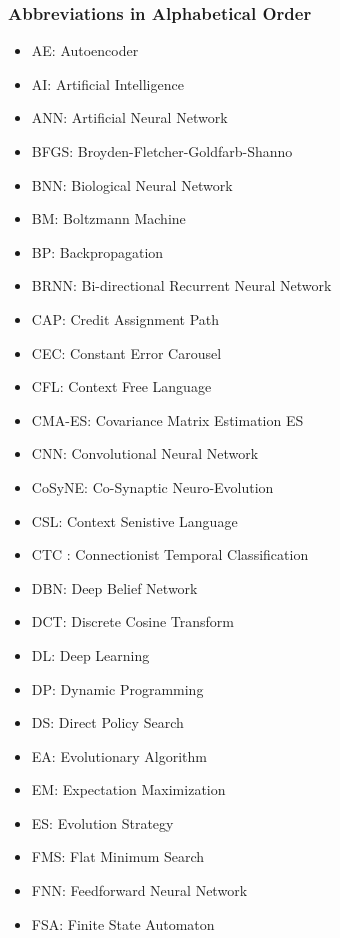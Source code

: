 \documentclass[letterpaper]{article}
\begin{document}
\subsubsection*{Abbreviations in Alphabetical Order}
\label{abb}
\vspace{-0.5cm}
\begin{multicols}{2}
\begin{itemize}[leftmargin=0cm,itemindent=0cm,labelwidth=\itemindent,labelsep=0cm,align=left,noitemsep,nolistsep]
\item[] AE: Autoencoder    
\item[] AI: Artificial Intelligence 
\item[] ANN: Artificial Neural Network    
\item[] BFGS: Broyden-Fletcher-Goldfarb-Shanno    
\item[] BNN: Biological Neural Network 
\item[] BM: Boltzmann Machine 
\item[] BP: Backpropagation 
\item[] BRNN: Bi-directional Recurrent Neural Network 
\item[] CAP: Credit Assignment Path 
\item[] CEC: Constant Error Carousel 
\item[] CFL: Context Free Language 
\item[] CMA-ES: Covariance Matrix Estimation ES 
\item[] CNN: Convolutional Neural Network 
\item[] CoSyNE: Co-Synaptic Neuro-Evolution 
\item[] CSL: Context Senistive Language
\item[] CTC : Connectionist Temporal Classification 
\item[] DBN: Deep Belief Network 
\item[] DCT: Discrete Cosine Transform
\item[] DL: Deep Learning 
\item[] DP: Dynamic Programming  
\item[] DS: Direct Policy Search
\item[] EA: Evolutionary Algorithm 
\item[] EM: Expectation Maximization 
\item[] ES: Evolution Strategy 
\item[] FMS: Flat Minimum Search
\item[] FNN: Feedforward Neural Network  
\item[] FSA: Finite State Automaton 

\end{itemize}
\end{multicols}
\end{document}
